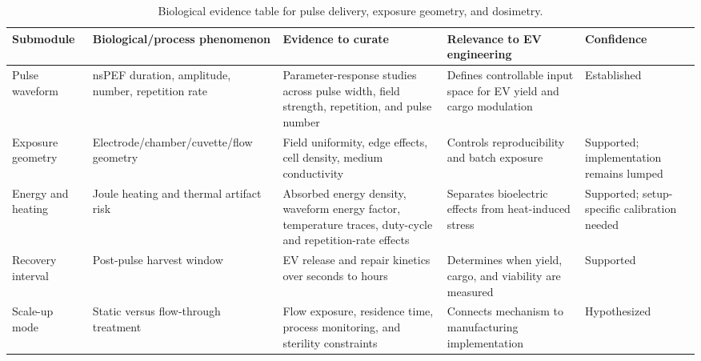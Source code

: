 \begin{table}[t]
\footnotesize\sf
\centering
\caption{Biological evidence table for pulse delivery, exposure geometry, and dosimetry.\label{T_A1_bio_dosimetry}}
\begin{tabular}{p{2.4cm} p{3.0cm} p{3.8cm} p{2.7cm} p{3.4cm}}
\toprule
\textbf{Submodule} & \textbf{Biological/process phenomenon} & \textbf{Evidence to curate} & \textbf{Relevance to EV engineering} & \textbf{Confidence} \\
\midrule
Pulse waveform & nsPEF duration, amplitude, number, repetition rate & Parameter-response studies across pulse width, field strength, repetition, and pulse number & Defines controllable input space for EV yield and cargo modulation & Established \cite{beebe2003nanosecond,vernier2003calcium,pakhomov2007membrane,semenov2013primary,orlacchio2023effects} \\
Exposure geometry & Electrode/chamber/cuvette/flow geometry & Field uniformity, edge effects, cell density, medium conductivity & Controls reproducibility and batch exposure & Supported; implementation remains lumped \cite{joshi2000electroporation,kotnik2019membrane,baker2024numerical,leveque2017measurement,orlacchio2023effects} \\
Energy and heating & Joule heating and thermal artifact risk & Absorbed energy density, waveform energy factor, temperature traces, duty-cycle and repetition-rate effects & Separates bioelectric effects from heat-induced stress & Supported; setup-specific calibration needed \cite{orlacchio2023effects,gudvangen2022electroporation,kanduser2008temperature,song2011synergistic,song2017thermal} \\
Recovery interval & Post-pulse harvest window & EV release and repair kinetics over seconds to hours & Determines when yield, cargo, and viability are measured & Supported\cite{silkunas2026peculiarities,szwedowicz2026reversible,bhattacharya2022calcium,muratori2017activation,williams2023annexin} \\
Scale-up mode & Static versus flow-through treatment & Flow exposure, residence time, process monitoring, and sterility constraints & Connects mechanism to manufacturing implementation & Hypothesized\cite{liu2026microfluidic,bakute2024microphysiological,garcia2016microfluidic,bonakdar2017microfluidic,li2015electroporation} \\
\bottomrule
\end{tabular}
\end{table}


